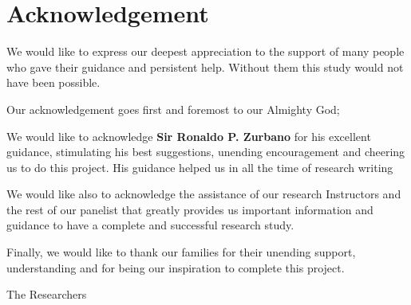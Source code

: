 \section*{\hfill Acknowledgement \hfill}

We would like to express our deepest appreciation to the support of many people who gave their guidance and persistent help.
Without them this study would not have been possible.

Our acknowledgement goes first and foremost to our Almighty God;

We would like to acknowledge \textbf{Sir Ronaldo P. Zurbano} for his excellent guidance, stimulating his best suggestions, unending encouragement and cheering us to do this project.
His guidance helped us in all the time of research writing

We would like also to acknowledge the assistance of our research Instructors and the rest of our panelist that greatly provides us important information and guidance to have a complete and successful research study.

Finally, we would like to thank our families for their unending support, understanding and for being our inspiration to complete this project.

\vspace{4em}

\begin{flushright}
    The Researchers
\end{flushright}
